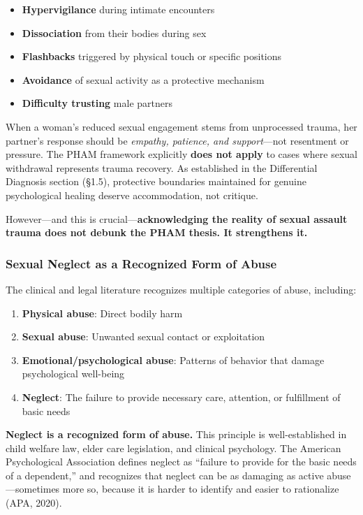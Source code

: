 \documentclass[12pt, letterpaper]{article}
\begin{document}
\begin{itemize}
    \item \textbf{Hypervigilance} during intimate encounters
    \item \textbf{Dissociation} from their bodies during sex
    \item \textbf{Flashbacks} triggered by physical touch or specific positions
    \item \textbf{Avoidance} of sexual activity as a protective mechanism
    \item \textbf{Difficulty trusting} male partners
\end{itemize}

When a woman's reduced sexual engagement stems from unprocessed trauma, her partner's response should be \textit{empathy, patience, and support}---not resentment or pressure. The PHAM framework explicitly \textbf{does not apply} to cases where sexual withdrawal represents trauma recovery. As established in the Differential Diagnosis section (\S 1.5), protective boundaries maintained for genuine psychological healing deserve accommodation, not critique.

However---and this is crucial---\textbf{acknowledging the reality of sexual assault trauma does not debunk the PHAM thesis. It strengthens it.}

\subsubsection{Sexual Neglect as a Recognized Form of Abuse}

The clinical and legal literature recognizes multiple categories of abuse, including:

\begin{enumerate}
    \item \textbf{Physical abuse}: Direct bodily harm
    \item \textbf{Sexual abuse}: Unwanted sexual contact or exploitation
    \item \textbf{Emotional/psychological abuse}: Patterns of behavior that damage psychological well-being
    \item \textbf{Neglect}: The failure to provide necessary care, attention, or fulfillment of basic needs
\end{enumerate}

\textbf{Neglect is a recognized form of abuse.} This principle is well-established in child welfare law, elder care legislation, and clinical psychology. The American Psychological Association defines neglect as ``failure to provide for the basic needs of a dependent,'' and recognizes that neglect can be as damaging as active abuse---sometimes more so, because it is harder to identify and easier to rationalize (APA, 2020).
\end{document}
